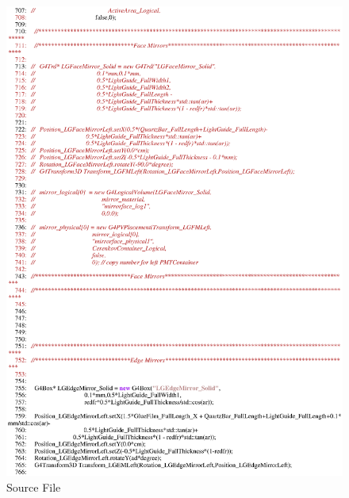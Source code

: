 \begin{figure}[ht]
  \hspace{0cm}
  \includegraphics[scale=0.8]{./figures5/QweakSimCerenkovDetector.cc-p12.eps}
  \caption{\label{SourceV12} Source File}
           \label{fig:V-SC-16}
\end{figure}
\clearpage

